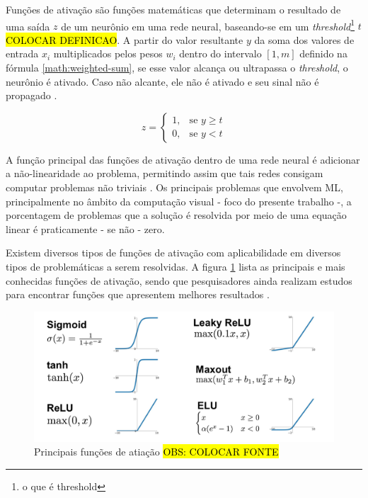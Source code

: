 Funções de ativação são funções matemáticas que determinam o resultado de uma saída \textbf{\(z\)} de um neurônio em uma rede neural, baseando-se em um \textit{threshold}\footnote{
  o que é threshold
} \textbf{\(t\)} \hl{COLOCAR DEFINICAO}.
A partir do valor resultante \textbf{\(y\)} da soma dos valores de entrada \(x_i\) multiplicados pelos pesos \(w_i\) dentro do intervalo \([1, m]\) definido na fórmula \ref{math:weighted-sum}, se esse valor alcança ou ultrapassa o \textit{threshold}, o neurônio é ativado. Caso não alcante, ele não é ativado e seu sinal não é propagado \cite{python-ml}.

\[
  z =
  \begin{cases}
    1, & \text{se } y\geq \textit{t} \\
    0, & \text{se } y < \textit{t}
  \end{cases}
\]

A função principal das funções de ativação dentro de uma rede neural é adicionar a não-linearidade ao problema, permitindo assim que tais redes consigam computar problemas não triviais \cite{gentle-intro-to-nn}. Os principais problemas que envolvem ML, principalmente no âmbito da computação visual - foco do presente trabalho -, a porcentagem de problemas que a solução é resolvida por meio de uma equação linear é praticamente - se não - zero.

Existem diversos tipos de funções de ativação com aplicabilidade em diversos tipos de problemáticas a serem resolvidas. A figura \ref{fig:activation-functions} lista as principais e mais conhecidas funções de ativação, sendo que pesquisadores ainda realizam estudos para encontrar funções que apresentem melhores resultados \cite{intro-to-act-func}.


\begin{figure}[H]
  \includegraphics[width=12cm, center]{figuras/activation-functions}
  \caption{Principais funções de atiação \hl{OBS: COLOCAR FONTE}}
  \label{fig:activation-functions}
\end{figure}

